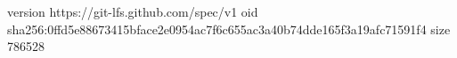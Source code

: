version https://git-lfs.github.com/spec/v1
oid sha256:0ffd5e88673415bface2e0954ac7f6c655ac3a40b74dde165f3a19afc71591f4
size 786528
